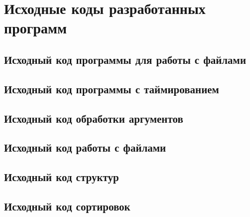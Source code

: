 \section{Исходные коды разработанных программ}

\subsection{Исходный код программы для работы с файлами}


\subsection{Исходный код программы с таймированием}


\subsection{Исходный код обработки аргументов}



\subsection{Исходный код работы с файлами}



\subsection{Исходный код структур}



\subsection{Исходный код сортировок}




